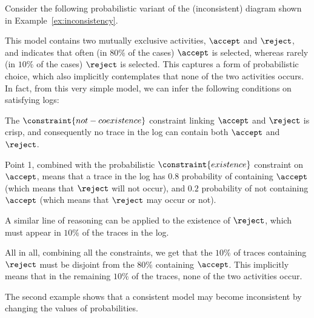 \begin{example}
\label{ex:consistent-prob}
Consider the following probabilistic variant of the (inconsistent) \declare diagram shown in Example~\ref{ex:inconsistency}.
\begin{center}
\end{center}
This model contains two mutually exclusive activities, $\accept$ and $\reject$, and indicates that often (in $80\%$ of the cases) $\accept$ is selected, whereas rarely (in $10\%$ of the cases) $\reject$ is selected. This captures a form of probabilistic choice, which also implicitly contemplates that none of the two activities occurs. In fact, from this very simple model, we can infer the following conditions on satisfying logs:
\begin{compactenum}
\item The $\constraint{not-coexistence}$ constraint linking $\accept$ and $\reject$ is crisp, and consequently no trace in the log can contain both $\accept$ and $\reject$.
\item Point 1, combined with the probabilistic $\constraint{existence}$ constraint on $\accept$, means that a trace in the log has $0.8$ probability of containing $\accept$ (which means that $\reject$ will not occur), and $0.2$ probability of not containing $\accept$ (which means that $\reject$ may occur or not).
\item A similar line of reasoning can be applied to the existence of $\reject$, which must appear in $10\%$ of the traces in the log.
\end{compactenum}
All in all, combining all the constraints, we get that the $10\%$ of traces containing $\reject$ must be disjoint from the $80\%$ containing $\accept$. This implicitly means that in the remaining $10\%$ of the traces, none of the two activities occur.
\end{example}

The second example shows that a consistent \pdeclare model may become inconsistent by changing the values of probabilities.

